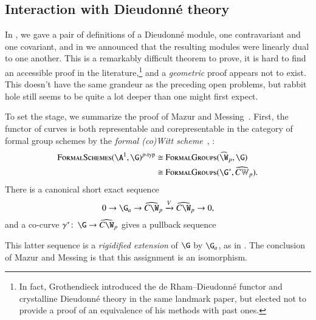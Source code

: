 \subsection*{Interaction with Dieudonn\'e theory}

In , we gave a pair of definitions of a Dieudonn\'e module, one contravariant and one covariant, and in  we announced that the resulting modules were linearly dual to one another.  This is a remarkably difficult theorem to prove, it is hard to find an accessible proof in the literature,\footnote{In fact, Grothendieck introduced the de Rham--Dieudonn\'e functor and crystalline Dieudonn\'e theory in the same landmark paper, but elected not to provide a proof of an equivalence of his methods with past ones.} and a \emph{geometric} proof appears not to exist.  This doesn't have the same grandeur as the preceding open problems, but rabbit hole still seems to be quite a lot deeper than one might first expect.

To set the stage, we summarize the proof of Mazur and Messing~\cite[Section II.15]{MazurMessing}.  First, the functor of curves is both representable and corepresentable in the category of formal group schemes by the \textit{formal (co)Witt scheme}~\cite[Chapter 3]{ZinkCartierTheory}, \cite[Section III.4]{LazardCFGs}:
\begin{align*}
\CatOf{FormalSchemes}(\A^1, \G)^{\ptyp} & \cong \CatOf{FormalGroups}(\widehat{\W}_p, \G) \\
& \cong \CatOf{FormalGroups}(\G^*, \widehat{C\mathbb W}_p).
\end{align*}
There is a canonical short exact sequence \[0 \to \G_a \to \widehat{C\W}_p \xrightarrow{V} \widehat{C\W}_p \to 0,\] and a co-curve $\gamma^*\co \G \to \widehat{C\W}_p$ gives a pullback sequence
\begin{center}
\end{center}
This latter sequence is a \textit{rigidified extension} of $\G$ by $\G_a$, as in .  The conclusion of Mazur and Messing is that this assignment is an isomorphism.

